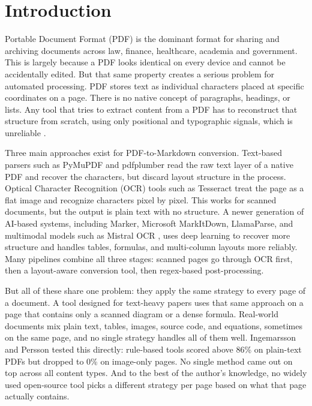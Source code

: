 \chapter{Introduction}

Portable Document Format (PDF) is the dominant format for sharing and archiving
documents across law, finance, healthcare, academia and government. This is
largely because a PDF looks identical on every device and cannot be accidentally
edited. But that same property creates a serious problem for automated
processing. PDF stores
text as individual characters placed at specific coordinates on a page. There
is no native concept of paragraphs, headings, or lists. Any tool that tries to extract content from
a PDF has to reconstruct that structure from scratch, using only positional
and typographic signals, which is unreliable \autocite{whitington2012}.

Three main approaches exist for PDF-to-Markdown conversion. Text-based parsers
such as PyMuPDF and pdfplumber \autocite{meuschke2023} read the raw text layer of
a native PDF and recover the characters, but discard layout structure in the
process. Optical Character Recognition (OCR) tools such as Tesseract \autocite{smith2007} treat the page as a flat
image and recognize characters pixel by pixel. This works for scanned documents,
but the output is plain text with no structure. A newer generation of
AI-based systems, including Marker, Microsoft MarkItDown, LlamaParse, and
multimodal models such as Mistral OCR \autocite{omnidocbench2025}, uses deep learning
to recover more structure and handles tables, formulas, and multi-column layouts
more reliably. Many pipelines combine all three stages: scanned pages go through
OCR first, then a layout-aware conversion tool, then regex-based post-processing.

But all of these share one problem: they apply the same strategy to every page
of a document. A tool designed for text-heavy papers uses that same approach on
a page that contains only a scanned diagram or a dense formula. Real-world
documents mix plain text, tables, images, source code, and equations, sometimes
on the same page, and no single strategy handles all of them well. Ingemarsson
and Persson \autocite{ingemarsson2024} tested this directly: rule-based tools scored
above 86\% on plain-text PDFs but dropped to 0\% on image-only pages. No single
method came out on top across all content types. And to the best of the author's
knowledge, no widely used open-source tool picks a different strategy per page
based on what that page actually contains.

